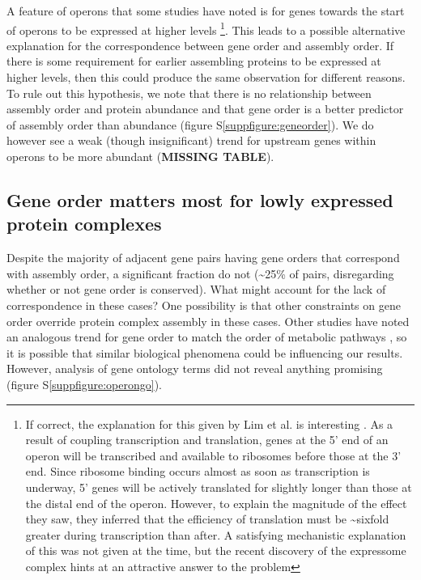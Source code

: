 \documentclass[a4paper,11pt,twoside,openright]{scrbook}
\begin{document}
A feature of operons that some studies have noted is for genes towards the start of operons to be expressed at higher levels \cite{Nishizaki2007,Lim2011} \footnote{If correct, the explanation for this given by Lim et al. is interesting \cite{Lim2011}. As a result of coupling transcription and translation, genes at the 5' end of an operon will be transcribed and available to ribosomes before those at the 3' end. Since ribosome binding occurs almost as soon as transcription is underway, 5' genes will be actively translated for slightly longer than those at the distal end of the operon. However, to explain the magnitude of the effect they saw, they inferred that the efficiency of translation must be \textasciitilde sixfold greater during transcription than after. A satisfying mechanistic explanation of this was not given at the time, but the recent discovery of the expressome complex \cite{Kohler2017} hints at an attractive answer to the problem}. This leads to a possible alternative explanation for the correspondence between gene order and assembly order. If there is some requirement for earlier assembling proteins to be expressed at higher levels, then this could produce the same observation for different reasons. To rule out this hypothesis, we note that there is no relationship between assembly order and protein abundance and that gene order is a better predictor of assembly order than abundance (figure S\ref{suppfigure:geneorder}). We do however see a weak (though insignificant) trend for upstream genes within operons to be more abundant (\textbf{MISSING TABLE}).

\subsection{Gene order matters most for lowly expressed protein complexes}
Despite the majority of adjacent gene pairs having gene orders that correspond with assembly order, a significant fraction do not (\textasciitilde 25\% of pairs, disregarding whether or not gene order is conserved). What might account for the lack of correspondence in these cases? One possibility is that other constraints on gene order override protein complex assembly in these cases. Other studies have noted an analogous trend for gene order to match the order of metabolic pathways \cite{Zaslaver2004,Kovacs2009}, so it is possible that similar biological phenomena could be influencing our results. However, analysis of gene ontology terms \cite{Huntley2015} did not reveal anything promising (figure S\ref{suppfigure:operongo}).
\end{document}
